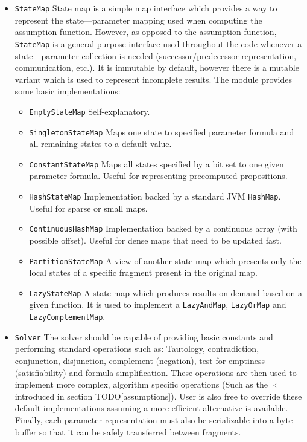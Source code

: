 \begin{itemize}
	\item \texttt{StateMap} State map is a simple map interface which provides a way to represent the state—parameter mapping used when computing the assumption function. However, as opposed to the assumption function, \texttt{StateMap} is a general purpose interface used throughout the code whenever a state—parameter collection is needed (successor/predecessor representation, communication, etc.). It is immutable by default, however there is a mutable variant which is used to represent incomplete results. The module provides some basic implementations:
	
	\begin{itemize}
		\item \texttt{EmptyStateMap} Self-explanatory.
		\item \texttt{SingletonStateMap} Maps one state to specified parameter formula and all remaining states to a default value.
		\item \texttt{ConstantStateMap} Maps all states specified by a bit set to one given parameter formula. Useful for representing precomputed propositions.
		\item \texttt{HashStateMap} Implementation backed by a standard JVM \texttt{HashMap}. Useful for sparse or small maps.
		\item \texttt{ContinuousHashMap} Implementation backed by a continuous array (with possible offset). Useful for dense maps that need to be updated fast.
		\item \texttt{PartitionStateMap} A view of another state map which presents only the local states of a specific fragment present in the original map.
		\item \texttt{LazyStateMap} A state map which produces results on demand based on a given function. It is used to implement a \texttt{LazyAndMap}, \texttt{LazyOrMap} and \texttt{LazyComplementMap}.
	\end{itemize}
	
	\item \texttt{Solver} The solver should be capable of providing basic constants and performing standard operations such as: Tautology, contradiction, conjunction, disjunction, complement (negation), test for emptiness (satisfiability) and formula simplification. These operations are then used to implement more complex, algorithm specific operations (Such as the $\Leftarrow$ introduced in section TODO[assumptions]). User is also free to override these default implementations assuming a more efficient alternative is available. Finally, each parameter representation must also be serializable into a byte buffer so that it can be safely transferred between fragments.
	

\end{itemize}
